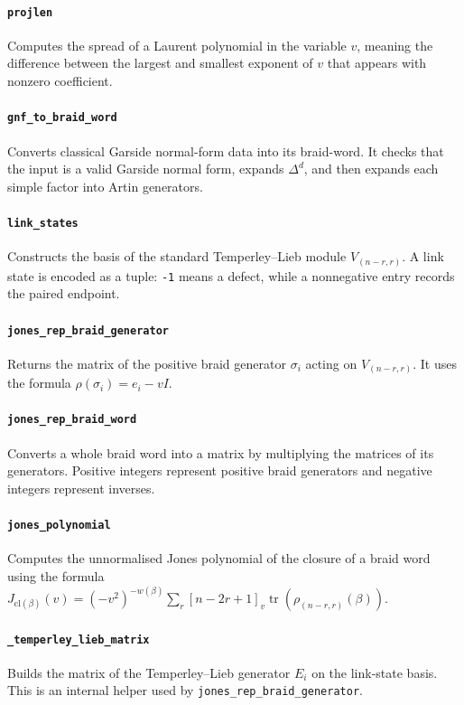 ﻿\documentclass[10pt]{article}
\begin{document}
\paragraph{\texttt{projlen}}
Computes the spread of a Laurent polynomial in the variable \(v\), meaning the difference between the largest and smallest exponent of \(v\) that appears with nonzero coefficient.

\paragraph{\texttt{gnf\_to\_braid\_word}}
Converts classical Garside normal-form data into its braid-word.
It checks that the input is a valid Garside normal form, expands \(\Delta^d\),
and then expands each simple factor into Artin generators.

\paragraph{\texttt{link\_states}}
Constructs the basis of the standard Temperley--Lieb module \(V_{(n-r,r)}\).
A link state is encoded as a tuple: \texttt{-1} means a defect, while a nonnegative entry records the paired endpoint.

\paragraph{\texttt{jones\_rep\_braid\_generator}}
Returns the matrix of the positive braid generator \(\sigma_i\) acting on \(V_{(n-r,r)}\).
It uses the formula $\rho(\sigma_i) = e_i - vI$.

\paragraph{\texttt{jones\_rep\_braid\_word}}
Converts a whole braid word into a matrix by multiplying the matrices of its generators.
Positive integers represent positive braid generators and negative integers represent inverses.

\paragraph{\texttt{jones\_polynomial}}
Computes the unnormalised Jones polynomial of the closure of a braid word using the formula
$J_{\mathrm{cl}(\beta)}(v)
= (-v^2)^{-w(\beta)}
\sum_r [n-2r+1]_v \operatorname{tr}(\rho_{(n-r,r)}(\beta))$.

\paragraph{\texttt{\_temperley\_lieb\_matrix}}
Builds the matrix of the Temperley--Lieb generator \(E_i\) on the link-state basis.
This is an internal helper used by \texttt{jones\_rep\_braid\_generator}.
\end{document}
